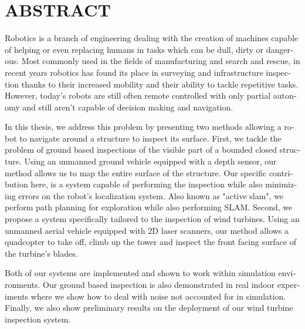 %

\chapter*{ABSTRACT}\thispagestyle{headings}
%
\begin{otherlanguage}{english}

Robotics is a branch of engineering dealing with the creation of machines capable
of helping or even replacing humans in tasks which can be dull, dirty or dangerous.
Most commonly used in the fields of manufacturing and search and rescue, in recent
years robotics has found its place in surveying and infrastructure inspection
thanks to their increased mobility and their ability to tackle repetitive tasks.
However, today's robots are still often remote controlled with only
partial autonomy and still aren't capable of decision making and navigation.

In this thesis, we address this problem by presenting two methods allowing a robot
to navigate around a structure to inspect its surface. First, we tackle
the problem of ground based inspections of the visible part of a bounded closed
structure. Using an unmanned ground vehicle equipped with a depth sensor, our
method allows us to map the entire surface of the structure. Our specific
contribution here, is a system capable of performing the inspection while also
minimizing errors on the robot's localization system. Also known as "active slam",
we perform path planning for exploration while also performing SLAM. Second, we
propose a system specifically tailored to the inspection of wind turbines. Using
an unmanned aerial vehicle equipped with 2D laser scanners, our method allows
a quadcopter to take off, climb up the tower and inspect the front facing
surface of the turbine's blades.

Both of our systems are implemented and shown to work within simulation environments.
Our ground based inspection is also demonstrated in real indoor experiments where
we show how to deal with noise not accounted for in simulation.
Finally, we also show preliminary results on the deployment of our wind turbine inspection
system.

\end{otherlanguage}
